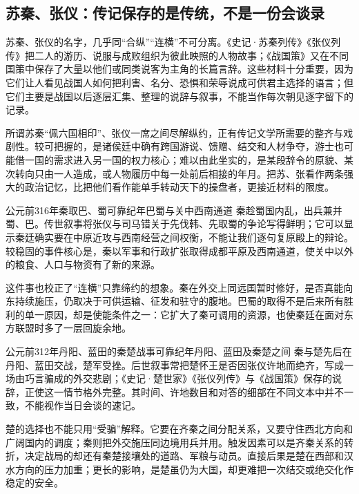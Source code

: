 \subsection{苏秦、张仪：传记保存的是传统，不是一份会谈录}

苏秦、张仪的名字，几乎同“合纵”“连横”不可分离。《史记·苏秦列传》《张仪列传》把二人的游历、说服与成败组织为彼此映照的人物故事；《战国策》又在不同国策中保存了大量以他们或同类说客为主角的长篇言辞。这些材料十分重要，因为它们让人看见战国人如何把利害、名分、恐惧和荣辱说成可供君主选择的语言；但它们主要是战国以后逐层汇集、整理的说辞与叙事，不能当作每次朝见逐字留下的记录。

所谓苏秦“佩六国相印”、张仪一席之间尽解纵约，正有传记文学所需要的整齐与戏剧性。较可把握的，是诸侯廷中确有跨国游说、馈赠、结交和人材争夺，游士也可能借一国的需求进入另一国的权力核心；难以由此坐实的，是某段辞令的原貌、某次转向只由一人造成，或人物履历中每一处前后相接的年月。把苏、张看作两条强大的政治记忆，比把他们看作能单手转动天下的操盘者，更接近材料的限度。

\begin{event}{公元前316年}{秦取巴、蜀}{可靠纪年}{巴蜀与关中西南通道}
秦趁蜀国内乱，出兵兼并蜀、巴。传世叙事将张仪与司马错关于先伐韩、先取蜀的争论写得鲜明；它可以显示秦廷确实要在中原近攻与西南经营之间权衡，不能让我们逐句复原殿上的辩论。较稳固的事件核心是，秦以军事和行政扩张取得成都平原及西南通道，使关中以外的粮食、人口与物资有了新的来源。

这件事也校正了“连横”只靠缔约的想象。秦在外交上同远国暂时修好，是否真能向东持续施压，仍取决于可供运输、征发和驻守的腹地。巴蜀的取得不是后来所有胜利的单一原因，却是使能条件之一：它扩大了秦可调用的资源，也使秦廷在面对东方联盟时多了一层回旋余地。
\end{event}

\begin{event}{公元前312年}{丹阳、蓝田的秦楚战事}{可靠纪年}{丹阳、蓝田及秦楚之间}
秦与楚先后在丹阳、蓝田交战，楚军受挫。后世叙事常把楚怀王是否因张仪许地而绝齐，写成一场由巧言骗成的外交悲剧；《史记·楚世家》《张仪列传》与《战国策》保存的说辞，正使这一情节格外完整。其时间、许地数目和对答的细部在不同文本中并不一致，不能视作当日会谈的速记。

楚的选择也不能只用“受骗”解释。它要在齐秦之间分配关系，又要守住西北方向和广阔国内的调度；秦则把外交施压同边境用兵并用。触发因素可以是齐秦关系的转折，决定战局的却还有秦楚接壤处的道路、军粮与动员。直接后果是楚在西部和汉水方向的压力加重；更长的影响，是楚虽仍为大国，却更难把一次结交或绝交化作稳定的安全。
\end{event}


